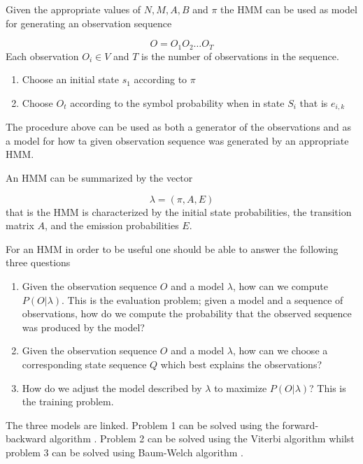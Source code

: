 Given the appropriate values of $N, M, A, B$ and $\pi$ the HMM can be used as model for generating an observation sequence

\begin{equation}
O = O_1O_2\dots O_T
\end{equation}
Each observation $O_i \in V$ and $T$ is the number of observations in the sequence.

\begin{framed}
	\begin{enumerate}
		\item Choose an initial state $s_1$ according to $\pi$
		\item Choose $O_t$ according to the symbol probability when in state $S_i$ that is $e_{i,k}$
	\end{enumerate}
\end{framed}

The procedure above can be used as both a generator of the observations and as a model for how ta given observation sequence was generated by an appropriate HMM.

An HMM can be summarized by the vector

\begin{equation}
\lambda = (\pi, A, E)
\label{hmm_vector}
\end{equation}
that is the HMM is characterized by the initial state probabilities, the transition matrix $A$, and the emission probabilities $E$.

For an HMM in order to be useful one should be able to answer the 
following three questions \cite{rabiner2009}

\begin{enumerate}
	\item Given the observation sequence $O$ and a model $\lambda$, how can we compute $P(O|\lambda)$. This is the evaluation problem; given a model and a sequence of observations, how do we compute the probability that the observed sequence was produced by the model?
	\item Given the observation sequence $O$ and a model $\lambda$, how can we choose a corresponding state sequence $Q$ which best explains the observations?
	\item How do we adjust the model described by $\lambda$ to maximize $P(O|\lambda)$? This is the training problem.
\end{enumerate}

The three models are linked. Problem 1 can be solved using the forward-backward algorithm \cite{rabiner2009}. Problem 2 can be solved using the Viterbi algorithm whilst problem 3 can be solved using Baum-Welch algorithm \cite{rabiner2009}.

